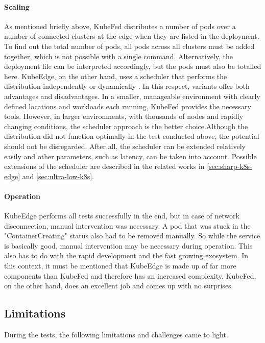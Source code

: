\documentclass[MSC,Master,english]{twbook}%
\begin{document}
\paragraph{Scaling} As mentioned briefly above, KubeFed distributes a number of pods over a number of connected clusters at the edge when they are listed in the deployment. To find out the total number of pods, all pods across all clusters must be added together, which is not possible with a single command. Alternatively, the deployment file can be interpreted accordingly, but the pods must also be totalled here. KubeEdge, on the other hand, uses a scheduler that performs the distribution independently or dynamically \cite{ke-doc-schedule}. In this respect, variants offer both advantages and disadvantages. In a smaller, manageable environment with clearly defined locations and workloads each running, KubeFed provides the necessary tools. However, in larger environments, with thousands of nodes and rapidly changing conditions, the scheduler approach is the better choice.Although the distribution did not function optimally in the test conducted above, the potential should not be disregarded. After all, the scheduler can be extended relatively easily and other parameters, such as latency, can be taken into account. Possible extensions of the scheduler are described in the related works in \autoref{sec:sharp-k8s-edge} and \autoref{sec:ultra-low-k8s}.

\paragraph{Operation} KubeEdge performs all tests successfully in the end, but in case of network disconnection, manual intervention was necessary. A pod that was stuck in the "ContainerCreating" status also had to be removed manually. So while the service is basically good, manual intervention may be necessary during operation. This also has to do with the rapid development and the fast growing exosystem. In this context, it must be mentioned that KubeEdge is made up of far more components than KubeFed and therefore has an increased complexity. KubeFed, on the other hand, does an excellent job and comes up with no surprises.

\subsection{Limitations}
During the tests, the following limitations and challenges came to light.
\end{document}
